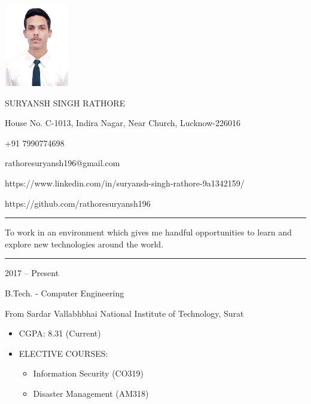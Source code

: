 \documentclass[a4paper,10pt]{article}
\newlength{\cvcolumngapwidth}
\newlength{\cvleftcolumnwidth}
\newlength{\cvrightcolumnwidth}
\newcommand{\cvnamestyle}[1]{{\Large\cvnamefont\textcolor{cvnamecolor}{#1}}}
\newcommand{\cvsectionstyle}[1]{{\normalsize\cvsectionfont\textcolor{cvsectioncolor}{#1}}}
\newcommand{\cvtitlestyle}[1]{{\large\cvtitlefont\textcolor{cvtitlecolor}{#1}}}
\newcommand{\cvdurationstyle}[1]{{\small\cvdurationfont\textcolor{cvdurationcolor}{#1}}}
\newlength{\cvafteritemskipamount}
\newlength{\cvaftersectionskipamount}
\newlength{\cvbetweensectionandheadingextraskipamount}
\newlength{\cvafternameskipamount}
\newlength{\cvafterpersonalinfolineskipamount}
\newlength{\cvaftertitleskipamount}
\newlength{\cvparskip}
\newcommand{\cvpersonalinfo}[2]{
    \begin{minipage}[t]{\cvleftcolumnwidth}
        \vspace{0mm} %
        \raggedleft #1
    \end{minipage}%
    \hspace{\cvcolumngapwidth}%
    \begin{minipage}[t]{\cvrightcolumnwidth}
        \vspace{0mm} %
        #2
    \end{minipage}

    \vspace{\cvafteritemskipamount}
}
\newcommand{\cvname}[1]{
    \cvnamestyle{#1}

    \vspace{\cvafternameskipamount}
}
\newcommand{\cvpersonalinfolinewithicon}[3]{
    \raisebox{.5\fontcharht\font`E-.5\height}{\texttt{[image: \#2]}}
    #3

    \vspace{\cvafterpersonalinfolineskipamount}
}
\newcommand{\cvsection}[1]{
    \begin{minipage}[t]{\cvleftcolumnwidth}
        \raggedleft\cvsectionstyle{#1}
    \end{minipage}%
    \hspace{\cvcolumngapwidth}%
    \begin{minipage}[t]{\cvrightcolumnwidth}
        \textcolor{cvrulecolor}{\rule{\cvrightcolumnwidth}{0.3mm}}
    \end{minipage}

    \vspace{\cvaftersectionskipamount}
}
\newcommand{\cvitem}[2]{
    \begin{minipage}[t]{\cvleftcolumnwidth}
        \raggedleft #1
    \end{minipage}%
    \hspace{\cvcolumngapwidth}%
    \begin{minipage}[t]{\cvrightcolumnwidth}
        \setlength{\parskip}{\cvparskip} #2
    \end{minipage}

    \vspace{\cvafteritemskipamount}
}
\newcommand{\cvtitle}[1]{
    \cvtitlestyle{#1}

    \vspace{\cvaftertitleskipamount}
    \vspace{-\cvparskip}
}
\begin{document}

\cvpersonalinfo{
    \includegraphics[height=36mm]{photo.jpg}
}{
    \cvname{SURYANSH SINGH RATHORE}

    \cvpersonalinfolinewithicon{height=4mm}{location_logo.png}{
        House No. C-1013, Indira Nagar, Near Church, Lucknow-226016
    }

    \cvpersonalinfolinewithicon{height=4mm}{call_logo.png}{
        +91 7990774698
    }

    \cvpersonalinfolinewithicon{height=4mm}{gmail_logo.png}{
        rathoresuryansh196@gmail.com
    }

    \cvpersonalinfolinewithicon{height=4mm}{linkedin_logo.jpeg}{
        https://www.linkedin.com/in/suryansh-singh-rathore-9a1342159/
    }
    
    \cvpersonalinfolinewithicon{height=4mm}{git_logo.png}{
        https://github.com/rathoresuryansh196
    }
}

\cvsection{OBJECTIVE}

\vspace{\cvbetweensectionandheadingextraskipamount}
\cvitem{
    \cvdurationstyle{ }
}{

    To work in an environment which gives me handful opportunities to learn and explore new technologies around the world.

}

\cvsection{EDUCATION}

\vspace{\cvbetweensectionandheadingextraskipamount}

\cvitem{
    \cvdurationstyle{2017 -- Present}
}{
    \cvtitle{B.Tech. - Computer Engineering}

    From Sardar Vallabhbhai National Institute of Technology, Surat

    \begin{itemize}[leftmargin=*]
        \item CGPA: 8.31 (Current)
        \item ELECTIVE COURSES: 
        \begin{itemize}[leftmargin=*]
        \item Information Security (CO319)
        \item Disaster Management (AM318)
        \end{itemize}
    \end{itemize}
}
\end{document}
